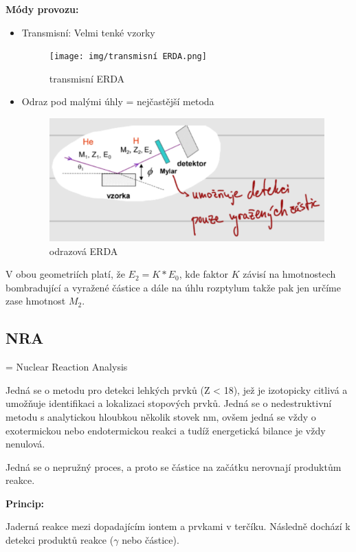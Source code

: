 \textbf{Módy provozu:}

\begin{itemize}
    \item Transmisní: Velmi tenké vzorky
    
    \begin{figure}[H]
        \centering
        \texttt{[image: img/transmisní ERDA.png]}
        \caption{transmisní ERDA}
    \end{figure}

    \item Odraz pod malými úhly = nejčastější metoda

    \begin{figure}[H]
        \centering
        \includegraphics[width=0.5\linewidth]{img/odrazová ERDA.png}
        \caption{odrazová ERDA}
    \end{figure}
\end{itemize}

V obou geometriích platí, že $E_2 = K * E_0$, kde faktor $K$ závisí na hmotnostech bombradující a vyražené částice a dále na úhlu rozptylum takže pak jen určíme zase hmotnost $M_2$.

\subsection{NRA}

= Nuclear Reaction Analysis

Jedná se o metodu pro detekci lehkých prvků (Z < 18), jež je izotopicky citlivá a umožňuje identifikaci a lokalizaci stopových prvků. Jedná se o nedestruktivní metodu s analytickou hloubkou několik stovek nm, ovšem jedná se vždy o exotermickou nebo endotermickou reakci a tudíž energetická bilance je vždy nenulová.

Jedná se o nepružný proces, a proto se částice na začátku nerovnají produktům reakce.

\textbf{Princip:}

Jaderná reakce mezi dopadajícím iontem a prvkami v terčíku. Následně dochází k detekci produktů reakce ($\gamma$ nebo částice).

